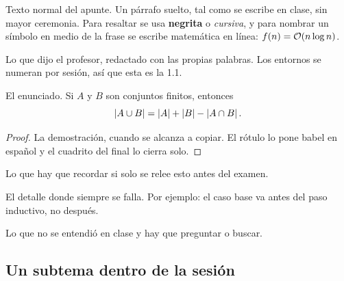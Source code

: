 
\portadilla
\newpage



Texto normal del apunte. Un párrafo suelto, tal como se escribe en
clase, sin mayor ceremonia. Para resaltar se usa \textbf{negrita} o
\emph{cursiva}, y para nombrar un símbolo en medio de la frase se
escribe matemática en línea: $f(n) = \mathcal{O}\!\left(n \log n\right)$.

\begin{definicion}
  Lo que dijo el profesor, redactado con las propias palabras. Los
  entornos se numeran por sesión, así que esta es la 1.1.
\end{definicion}

\begin{teorema}
  El enunciado. Si $A$ y $B$ son conjuntos finitos, entonces
  \[
    \left\lvert A \cup B \right\rvert = \left\lvert A \right\rvert + \left\lvert B \right\rvert - \left\lvert A \cap B \right\rvert.
  \]
\end{teorema}

\begin{proof}
  La demostración, cuando se alcanza a copiar. El rótulo lo pone babel
  en español y el cuadrito del final lo cierra solo.
\end{proof}

\begin{idea}
  Lo que hay que recordar si solo se relee esto antes del examen.
\end{idea}

\begin{ojo}
  El detalle donde siempre se falla. Por ejemplo: el caso base va
  antes del paso inductivo, no después.
\end{ojo}

\begin{pendiente}
  Lo que no se entendió en clase y hay que preguntar o buscar.
\end{pendiente}

\subsection{Un subtema dentro de la sesión}

